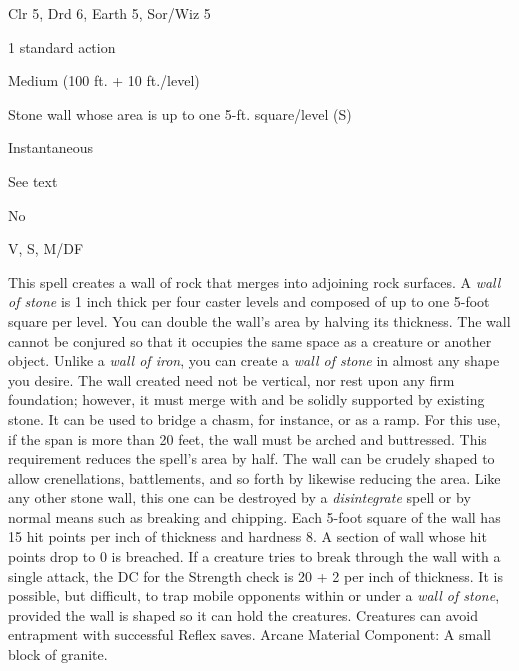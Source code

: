 
\begin{description*}
\item[Level:] Clr 5, Drd 6, Earth 5, Sor/Wiz 5
\item[Casting Time:] 1 standard action
\item[Range:] Medium (100 ft. + 10 ft./level)
\item[Effect:] Stone wall whose area is up to one 5-ft. square/level (S)
\item[Duration:] Instantaneous
\item[Saving Throw:] See text
\item[Spell Resistance:] No
\item[Components:] V, S, M/DF
\end{description*}

This spell creates a wall of rock that merges into adjoining rock surfaces. A \textit{wall
of stone} is 1 inch thick per four caster levels and composed of up to one 5-foot
square per level. You can double the wall's area by halving its thickness. The
wall cannot be conjured so that it occupies the same space as a creature or another
object.
Unlike a \textit{wall of iron}, you can create a \textit{wall of stone} in almost
any shape you desire. The wall created need not be vertical, nor rest upon any
firm foundation; however, it must merge with and be solidly supported by existing
stone. It can be used to bridge a chasm, for instance, or as a ramp. For this use,
if the span is more than 20 feet, the wall must be arched and buttressed. This
requirement reduces the spell's area by half. The wall can be crudely shaped to
allow crenellations, battlements, and so forth by likewise reducing the area.
Like any other stone wall, this one can be destroyed by a \textit{disintegrate
}spell or by normal means such as breaking and chipping. Each 5-foot square of
the wall has 15 hit points per inch of thickness and hardness 8. A section of wall
whose hit points drop to 0 is breached. If a creature tries to break through the
wall with a single attack, the DC for the Strength check is 20 + 2 per inch of
thickness.
It is possible, but difficult, to trap mobile opponents within or under a \textit{wall
of stone}, provided the wall is shaped so it can hold the creatures. Creatures
can avoid entrapment with successful Reflex saves.
Arcane Material Component: A small block of granite.